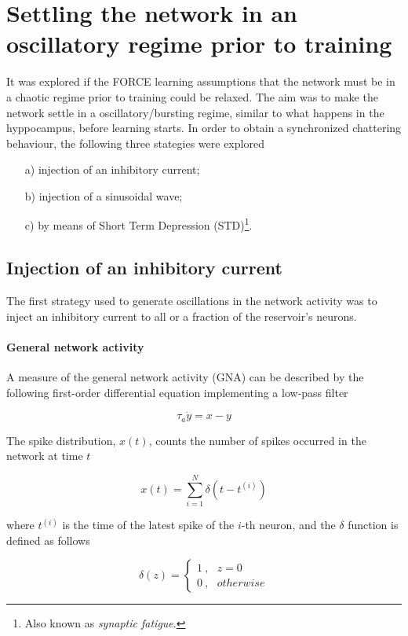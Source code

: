 \documentclass[10pt,a4paper, final]{report} %
\begin{document}
\section{Settling the network in an oscillatory regime prior to training}
It was explored if the FORCE learning assumptions that the network must be in a chaotic regime prior to training could be relaxed. The aim was to make the network settle in a oscillatory/bursting regime, similar to what happens in the hyppocampus, before learning starts. In order to obtain a synchronized chattering behaviour, the following three stategies were explored

\begin{itemize}
\item[a)] injection of an inhibitory current;
\item[b)] injection of a sinusoidal wave;
\item[c)] by means of Short Term Depression (STD)\footnote{Also known as \textit{synaptic fatigue}.}.
\end{itemize}

\subsection{Injection of an inhibitory current}
The first strategy used to generate oscillations in the network activity was to inject an inhibitory current to all or a fraction of the reservoir's neurons. 

\paragraph{General network activity}
A measure of the general network activity (GNA) can be described by the following first-order differential equation implementing a low-pass filter

\begin{equation}
\tau_a \dot y =  x-y
\label{eq:low_pass_filter}
\end{equation}

The spike distribution, $x(t)$, counts the number of spikes occurred in the network at time $t$

\begin{equation}
x(t) = \sum_{i=1}^N \delta(t - t^{(i)})
\end{equation}

where $t^{(i)}$ is the time of the latest spike of the $i$-th neuron, and the $\delta$ function is defined as follows

\begin{equation}
\delta(z) = 
\begin{cases}
1\ ,\ \ \ z=0\\
0\ ,\ \ \ otherwise
\end{cases}
\end{equation}
\end{document}
